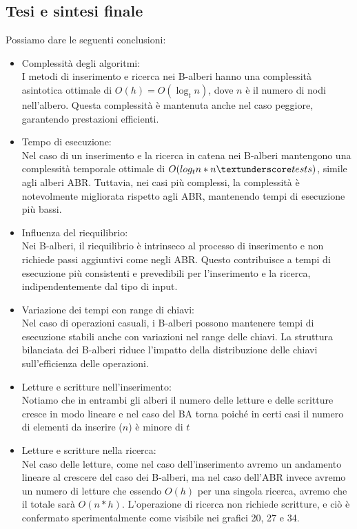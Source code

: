 \subsection{Tesi e sintesi finale}
\label{TesiSintesiFinale_1}
Possiamo dare le seguenti conclusioni:
\begin{itemize}
    \item Complessità degli algoritmi:\\
        I metodi di inserimento e ricerca nei B-alberi hanno una complessità asintotica ottimale di $O(h) = O(\log_t n)$, dove $n$ è il numero di nodi nell'albero. Questa complessità è mantenuta anche nel caso peggiore, garantendo prestazioni efficienti.
    \item Tempo di esecuzione:\\
        Nel caso di un inserimento e la ricerca in catena nei B-alberi mantengono una complessità temporale ottimale di $O(log_t n * n\textunderscore tests)$, simile agli alberi ABR. Tuttavia, nei casi più complessi, la complessità è notevolmente migliorata rispetto agli ABR, mantenendo tempi di esecuzione più bassi.
    
    \item Influenza del riequilibrio:\\
        Nei B-alberi, il riequilibrio è intrinseco al processo di inserimento e non richiede passi aggiuntivi come negli ABR. Questo contribuisce a tempi di esecuzione più consistenti e prevedibili per l'inserimento e la ricerca, indipendentemente dal tipo di input.
    
    \item Variazione dei tempi con range di chiavi:\\
        Nel caso di operazioni casuali, i B-alberi possono mantenere tempi di esecuzione stabili anche con variazioni nel range delle chiavi. La struttura bilanciata dei B-alberi riduce l'impatto della distribuzione delle chiavi sull'efficienza delle operazioni.

    \item Letture e scritture nell'inserimento:\\
        Notiamo che in entrambi gli alberi il numero delle letture e delle scritture cresce in modo lineare e nel caso del BA torna poiché in certi casi il numero di elementi da inserire ($n$) è minore di $t$

    \item Letture e scritture nella ricerca:\\
        Nel caso delle letture, come nel caso dell'inserimento avremo un andamento lineare al crescere del caso dei B-alberi, ma nel caso dell'ABR invece avremo un numero di letture che essendo $O(h)$ per una singola ricerca, avremo che il totale sarà $O(n*h)$. L'operazione di ricerca non richiede scritture, e ciò è confermato sperimentalmente come visibile nei grafici 20, 27 e 34.
    

\end{itemize}
